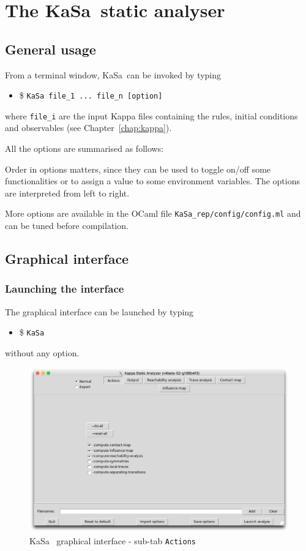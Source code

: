 \documentclass[11pt]{book}
\def\KaSa{\textsf{KaSa}}
\def\ttt#1{\texttt{#1}}
\def\ITE#1{\begin{itemize}#1\end{itemize}}
\begin{document}
\chapter{The \KaSa~static analyser}

\section{General usage}

From a terminal window, \KaSa~can be invoked by typing
\ITE{
\item[\$] \ttt{KaSa file\_1 ... file\_n  [option]}
}
where \ttt{file\_i} are the input Kappa files containing the rules, initial conditions and observables (see Chapter~\ref{chap:kappa}).

All the options are summarised as follows:


Order in options matters, since they can be used to toggle on/off some functionalities or to assign a value to some environment variables.
The options are interpreted from left to right.

More options are available in the OCaml file \texttt{KaSa\_rep/config/config.ml} and can be tuned before compilation.

\section{Graphical interface}

\subsection{Launching the interface}

The graphical interface can be launched by typing
\ITE{\item[\$] \ttt{KaSa}}

without any option.

\begin{figure}[htbp]
\centering
\includegraphics[width=12cm,bb=0 0 1904 1208]{img/kasa_0.png}
\caption{\KaSa~ graphical interface - sub-tab \texttt{Actions}}
\label{fig:kasa:0}
\end{figure}
\end{document}

